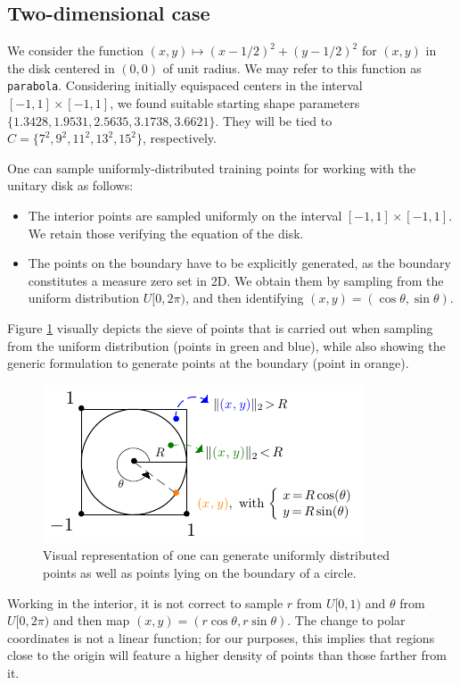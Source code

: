 \documentclass[12pt]{report} %
\begin{document}
\clearpage
\subsection*{Two-dimensional case}

We consider the function $(x,y) \mapsto (x-1/2)^2 + (y-1/2)^2$ for $(x,y)$ in the disk centered in $(0,0)$ of unit radius. We may refer to this function as \texttt{parabola}. Considering initially equispaced centers in the interval $[-1,1]\times[-1,1]$, we found suitable starting shape parameters $\{1.3428, 1.9531, 2.5635, 3.1738, 3.6621\}$. They will be tied to $C=\{7^2,9^2,11^2,13^2,15^2\}$, respectively.

One can sample uniformly-distributed training points for working with the unitary disk as follows:
\begin{itemize}
  \item The interior points are sampled uniformly on the interval $[-1,1]\times[-1,1]$. We retain those verifying the equation of the disk.
  \item The points on the boundary have to be explicitly generated, as the boundary constitutes a measure zero set in 2D. We obtain them by sampling from the uniform distribution $U[0,2\pi)$, and then identifying $(x,y)=(\cos\theta, \sin\theta)$.
\end{itemize}

Figure \ref{fig:uniform-circle} visually depicts the sieve of points that is carried out when sampling from the uniform distribution (points in green and blue), while also showing the generic formulation to generate points at the boundary (point in orange).

\begin{figure}[h]  
  \includegraphics[width=.5\textwidth]{imagenes/experiments/helpful_images/uniform_circle.pdf}
  \caption{Visual representation of one can generate uniformly distributed points as well as points lying on the boundary of a circle.}
  \label{fig:uniform-circle}
\end{figure}

Working in the interior, it is not correct to sample $r$ from $U[0,1)$ and $\theta$ from $U[0,2\pi)$ and then map $(x,y)=(r \cos \theta, r \sin \theta)$. The change to polar coordinates is not a linear function; for our purposes, this implies that regions close to the origin will feature a higher density of points than those farther from it.
\end{document}
